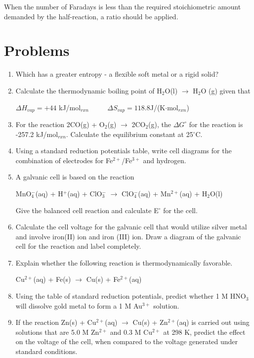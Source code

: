 \documentclass[../chem.tex]{subfiles}
\begin{document}
When the number of Faradays is less than the required stoichiometric amount demanded by the half-reaction, a ratio should be applied.

\section*{Problems}
\begin{enumerate}
    \item Which has a greater entropy - a flexible soft metal or a rigid solid?
    \item Calculate the thermodynamic boiling point of H$_2$O(l) $\rightarrow$ H$_2$O (g) given that 
    \begin{center}
        $\Delta H_{vap} = +44$ kJ/mol$_{rxn}$ $\qquad$ $\Delta S_{vap} = 118.8$J/(K$\cdot$mol$_{rxn}$)
    \end{center}
    \item For the reaction 2CO(g) + O$_2$(g) $\rightarrow$ 2CO$_2$(g), the $\Delta G^{\circ}$ for the reaction is -257.2 kJ/mol$_{rxn}$. Calculate the equilibrium constant at 25$^{\circ}$C.
    \item Using a standard reduction potentials table, write cell diagrams for the combination of electrodes for Fe$^{2+}$/Fe$^{3+}$ and hydrogen.
    \item A galvanic cell is based on the reaction 
    \begin{center}
        MnO$_4^-$(aq) + H$^+$(aq) + ClO$_3^-$ $\rightarrow$ ClO$_4^-$(aq) + Mn$^{2+}$(aq) + H$_2$O(l)
    \end{center}
    Give the balanced cell reaction and calculate E$^{\circ}$ for the cell.
    \item Calculate the cell voltage for the galvanic cell that would utilize silver metal and involve iron(II) ion and iron (III) ion. Draw a diagram of the galvanic cell for the reaction and label completely.
    \item Explain whether the following reaction is thermodynamically favorable.
    \begin{center}
        Cu$^{2+}$(aq) + Fe(s) $\rightarrow$ Cu(s) + Fe$^{2+}$(aq)
    \end{center}
    \item Using the table of standard reduction potentials, predict whether 1 M HNO$_3$ will dissolve gold metal to form a 1 M Au$^{3+}$ solution.
    \item If the reaction Zn(s) + Cu$^{2+}$(aq) $\rightarrow$ Cu(s) + Zn$^{2+}$(aq) is carried out using solutions that are 5.0 M Zn$^{2+}$ and 0.3 M Cu$^{2+}$ at 298 K, predict the effect on the voltage of the cell, when compared to the voltage generated under standard conditions.

\end{enumerate}
\end{document}
